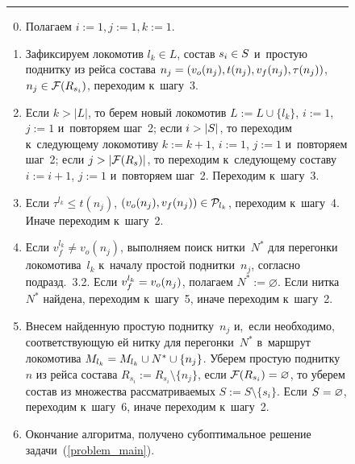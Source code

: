 \begin{multicols}{2}
\begin{figure*}
\vspace*{3pt}  
\hrule

\vspace*{2pt}
        \begin{enumerate}[1.]
        \setcounter{enumi}{-1}
        
        \item
        Полагаем $i:=1, j:=1, k:=1$.
        
        \item
        Зафиксируем локомотив $l_k \in L$, состав $s_i \hm\in S$ и~простую поднитку 
        из рейса состава $n_j \hm= (v_o(n_j), t(n_j), v_f(n_j), \tau(n_j))$, 
        $n_j \hm\in \mathcal F(R_{s_i})$, переходим к~шагу~3.
        
        \item
        Если $k > |L|$, то берем новый локомотив $L:=L \cup \{l_k\}$, 
        $i:=1$, $j:=1$ и~повторяем шаг~2; если $i\hm > |S|$, то переходим 
        к~следующему локомотиву $k := k+1$, $i:=1$, $j:=1$ и~повторяем шаг~2; 
        если $j\hm > |\mathcal F(R_s)|$, то переходим к~следующему составу 
        $i := i+1$, $j:=1$ и~повторяем шаг~2. Переходим к~шагу~3.
        
        \item
        Если $\tau^{l_k} \leqslant t(n_j)$, $(v_o(n_j), v_f(n_j))\hm \in 
        \mathcal P_{l_k}$, переходим к~шагу~4. Иначе переходим к~шагу~2.
        
        \item
        Если $v^{l_k}_f \ne v_o(n_j)$, выполняем поиск нитки~$N^*$ 
        для перегонки локомотива~$l_k$ к~началу простой поднитки~$n_j$, согласно 
        подразд.~3.2. Если $v^{l_k}_f \hm= v_o(n_j)$, полагаем 
        $N^*:=\varnothing$. Если нитка~$N^*$ найдена, переходим к~шагу~5, 
        иначе переходим к~шагу~2.

        \item
        Внесем найденную простую поднитку~$n_j$ и,~если необходимо, соответствующую 
        ей нитку для перегонки~$N^*$ в~маршрут локомотива $M_{l_k} \hm= M_{l_k} 
        \cup N^* \cup \{n_j\}$. Уберем простую поднитку~$n$ из рейса состава 
        $R_{s_i} := R_{s_i} \setminus \{n_j\}$, если $\mathcal F(R_{s_i})\hm = 
        \varnothing$, то уберем состав из множества рассматриваемых
         $S := S \setminus \{s_i\}$. Если $S \hm= \varnothing$, 
         переходим к~шагу~6, иначе переходим к~шагу~2.

        \item
        Окончание алгоритма, получено субоптимальное решение 
        задачи~(\ref{problem_main}).


\end{enumerate}
\end{figure*}
\end{multicols}

